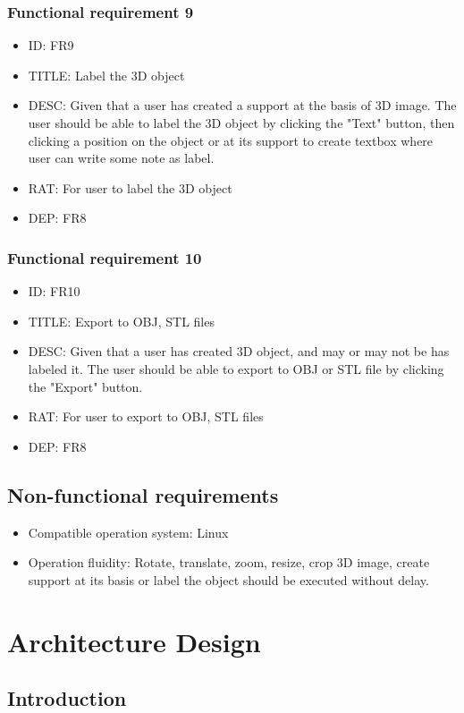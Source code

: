 \documentclass[11pt]{article}
\begin{document}
\subsubsection{Functional requirement 9}
\begin{itemize}
\item ID: FR9
\item TITLE: Label the 3D object
\item DESC: Given that a user has created a support at the basis of 3D image. The user should be able to label the 3D object by clicking the "Text" button, then clicking a position on the object or at its support to create textbox where user can write some note as label.
\item RAT: For user to label the 3D object
\item DEP: FR8
\end{itemize}
\subsubsection{Functional requirement 10}
\begin{itemize}
\item ID: FR10
\item TITLE: Export to OBJ, STL files
\item DESC: Given that a user has created 3D object, and may or may not be has labeled it. The user should be able to export to OBJ or STL file by clicking the "Export" button. 
\item RAT: For user to export to OBJ, STL files
\item DEP: FR8
\end{itemize}
\subsection{Non-functional requirements}
\begin{itemize}
\item Compatible operation system: Linux
\item Operation fluidity: Rotate, translate, zoom, resize, crop 3D image, create support at its basis or label the object should be executed without delay. 
\end{itemize}

\section{Architecture Design}
\subsection{Introduction}
\end{document}
